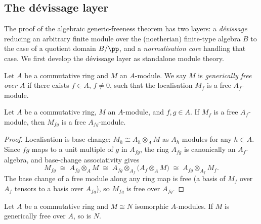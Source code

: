 \subsection{The dévissage layer}
\label{sec:generic_freeness_devissage}

The proof of the algebraic generic-freeness theorem has two layers: a
\emph{dévissage} reducing an arbitrary finite module over the (noetherian)
finite-type algebra \(B\) to the case of a quotient domain \(B/\pp\), and a
\emph{normalisation core} handling that case. We first develop the dévissage
layer as standalone module theory.

\begin{definition}\leanok
  \label{def:generically_free}
  Let \(A\) be a commutative ring and \(M\) an \(A\)-module.  We say \(M\) is
  \emph{generically free over \(A\)} if there exists \(f \in A\), \(f \ne 0\),
  such that the localisation \(M_f\) is a free \(A_f\)-module.
\end{definition}

\begin{lemma}\leanok
  \label{lem:generically_free_transport}
  Let \(A\) be a commutative ring, \(M\) an \(A\)-module, and \(f, g \in A\).
  If \(M_f\) is a free \(A_f\)-module, then \(M_{fg}\) is a free
  \(A_{fg}\)-module.
\end{lemma}

\begin{proof}
\leanok
  Localisation is base change: \(M_h \cong A_h \otimes_A M\) as
  \(A_h\)-modules for any \(h \in A\).  Since \(fg\) maps to a unit multiple
  of \(g\) in \(A_{fg}\), the ring \(A_{fg}\) is canonically an
  \(A_f\)-algebra, and base-change associativity gives
  \[
    M_{fg} \;\cong\; A_{fg} \otimes_A M
    \;\cong\; A_{fg} \otimes_{A_f} \bigl(A_f \otimes_A M\bigr)
    \;\cong\; A_{fg} \otimes_{A_f} M_f .
  \]
  The base change of a free module along any ring map is free (a basis of
  \(M_f\) over \(A_f\) tensors to a basis over \(A_{fg}\)), so \(M_{fg}\) is
  free over \(A_{fg}\).
\end{proof}

\begin{lemma}\leanok
  \label{lem:generically_free_of_equiv}
  Let \(A\) be a commutative ring and \(M \cong N\) isomorphic \(A\)-modules.
  If \(M\) is generically free over \(A\), so is \(N\).
\end{lemma}

